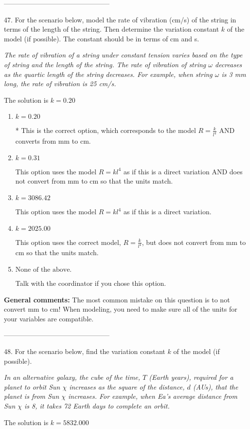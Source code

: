\documentclass{article}[14pt]
\begin{document}
-----------------------------------------------

47. For the scenario below, model the rate of vibration (cm/s) of the string in terms of the length of the string. Then determine the variation constant $k$ of the model (if possible). The constant should be in terms of cm and s.
\begin{center} \textit{The rate of vibration of a string under constant tension varies based on the type of string and the length of the string. The rate of vibration of string $\omega$ decreases as the quartic length of the string decreases. For example, when string $\omega$ is 3 mm long, the rate of vibration is 25 cm/s.} \end{center} 
The solution is $ k = 0.20 $ 

\begin{enumerate}[label=\Alph*.] 
\item $ k = 0.20 $ 

 * This is the correct option, which corresponds to the model $R = \frac{k}{l^{4}}$ AND converts from mm to cm. 
\item $ k = 0.31 $ 

 This option uses the model $R = kl^{4}$ as if this is a direct variation AND does not convert from mm to cm so that the units match. 
\item $ k = 3086.42 $ 

 This option uses the model $R = kl^{4}$ as if this is a direct variation. 
\item $ k = 2025.00 $ 

 This option uses the correct model, $R = \frac{k}{l^{4}}$, but does not convert from mm to cm so that the units match. 
\item $ \text{None of the above.} $ 

 Talk with the coordinator if you chose this option. 
\end{enumerate} 
 
\textbf{General comments:} The most common mistake on this question is to not convert mm to cm! When modeling, you need to make sure all of the units for your variables are compatible.

-----------------------------------------------

48. For the scenario below, find the variation constant $k$ of the model (if possible).
\begin{center} \textit{In an alternative galaxy, the cube of the time, $T$ (Earth years), required for a planet to orbit Sun $\chi$ increases as the square of the distance, $d$ (AUs), that the planet is from Sun $\chi$ increases. For example, when Ea's average distance from Sun $\chi$ is 8, it takes 72 Earth days to complete an orbit.} \end{center} 
The solution is $ k = 5832.000 $ 
\end{document}

